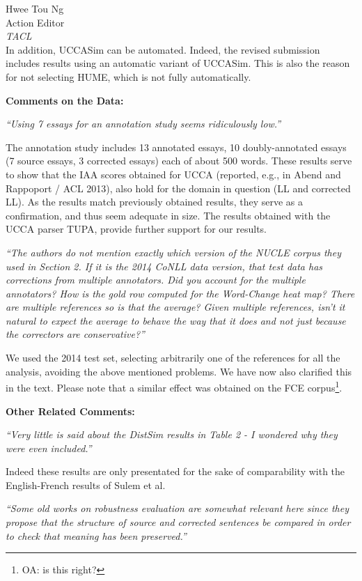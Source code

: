 \documentclass[11pt,letterpaper]{letter}
\newcommand{\oa}[1]{\footnote{\color{red}OA: #1}}
\begin{document}
\begin{letter}{%
Hwee Tou Ng\\
Action Editor\\
{\em TACL}\\
}
In addition, UCCASim can be automated. Indeed, the revised submission includes results using an automatic variant of UCCASim. This is also the reason for not selecting HUME, which is not fully automatically.


\vspace{.5cm}
{\large\bf Comments on the Data:}

\emph{``Using 7 essays for an annotation study seems ridiculously low.''}

The annotation study includes 13 annotated essays, 10 doubly-annotated essays (7 source essays, 3 corrected essays) each of about 500 words. These results serve to show that the IAA scores obtained for UCCA (reported, e.g., in Abend and Rappoport / ACL 2013), also hold for the domain in question (LL and corrected LL). As the results match previously obtained results, they serve as a confirmation, and thus seem adequate in size. The results obtained with the UCCA parser TUPA, provide further support for our results.

\emph{``The authors do not mention exactly which version of the NUCLE corpus
	they used in Section 2. If it is the 2014 CoNLL data version, that test data
	has corrections from multiple annotators. Did you account for the multiple
	annotators? How is the gold row computed for the Word-Change heat map? There
	are multiple references so is that the average? Given multiple references,
	isn't it natural to expect the average to behave the way that it does and
	not just because the correctors are conservative?''}

We used the 2014 test set, selecting arbitrarily one of the references for all the analysis, avoiding the above mentioned problems. We have now also clarified this in the text. Please note that a similar effect was obtained on the FCE corpus\oa{is this right?}.

\vspace{.5cm}
{\large\bf Other Related Comments:}
	
\emph{``Very little is said about the DistSim results in Table 2 - I wondered why
	they were even included.''}
	
Indeed these results are only presentated for the sake of comparability with the English-French results of Sulem et al.
	
\emph{``Some old works on robustness evaluation are somewhat relevant here since
	they propose that the structure of source and corrected sentences be
	compared in order to check that meaning has been preserved.''}
	

\end{letter}
\end{document}

